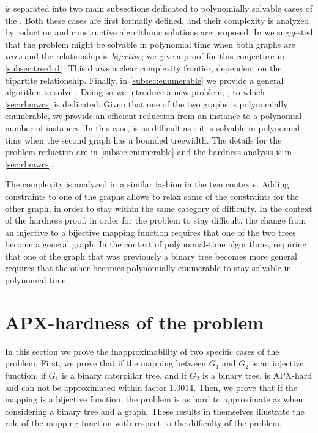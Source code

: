 	 is separated into two main subsections dedicated to polynomially solvable cases of the \mwccs{}.
	Both these cases are first formally defined, and their complexity is analyzed by reduction and constructive algorithmic solutions are proposed.
	In \cite{hume2015approximation} we suggested that the problem might be solvable in polynomial time when both graphs are \emph{trees} and the relationship is \emph{bijective}; we give a proof for this conjecture in \cref{subsec:tree1o1}.
	This draws a clear complexity frontier, dependent on the bipartite relationship.
	Finally, in \cref{subsec:enumerable} we provide a general algorithm to solve \mwccs{}.
	Doing so we introduce a new problem, \rbmwcs{}, to which \cref{sec:rbmwcs} is dedicated.
	Given that one of the two graphs is polynomially enumerable, we provide an efficient reduction from an \mwccs{} instance to a polynomial number of \rbmwcs{} instances.
	In this case, \mwccs{} is as difficult as \rbmwcs{}: it is solvable in polynomial time when the second graph has a bounded treewidth.
	The details for the problem reduction are in \cref{subsec:enumerable} and the \rbmwcs{} hardness analysis is in \cref{sec:rbmwcs}.

	The complexity is analyzed in a similar fashion in the two contexts.
	Adding constraints to one of the graphs allows to relax some of the constraints for the other graph, in order to stay within the same category of difficulty.
	In the context of the hardness proof, in order for the problem to stay difficult, the change from an injective to a bijective mapping function requires that one of the two trees become a general graph.
	In the context of polynomial-time algorithms, requiring that one of the graph that was previously a binary tree becomes more general %
	requires that the other becomes polynomially enumerable to stay solvable in polynomial time.
	
	\section{APX-hardness of the \mwccs{} problem}
	\label{sec:apx}

		In this section we prove the inapproximability of two specific cases of the \mwccs{} problem.
		First, we prove that if the mapping between $G_1$ and $G_2$ is an injective function, if $G_1$ is a binary caterpillar tree, and if $G_2$ is a binary tree, \mwccs{} is APX-hard and can not be approximated within factor $1.0014$.
		Then, we prove that if the mapping is a bijective function, the problem is as hard to approximate as when considering a binary tree and a graph.
		These results in themselves illustrate the role of the mapping function with respect to the difficulty of the problem.


